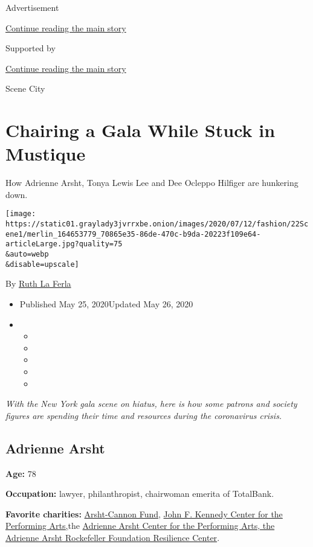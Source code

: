 Advertisement

\protect\hyperlink{after-top}{Continue reading the main story}

Supported by

\protect\hyperlink{after-sponsor}{Continue reading the main story}

Scene City

\hypertarget{chairing-a-gala-while-stuck-in-mustique}{%
\section{Chairing a Gala While Stuck in
Mustique}\label{chairing-a-gala-while-stuck-in-mustique}}

How Adrienne Arsht, Tonya Lewis Lee and Dee Ocleppo Hilfiger are
hunkering down.

\texttt{[image: https://static01.graylady3jvrrxbe.onion/images/2020/07/12/fashion/22Scene1/merlin\_164653779\_70865e35-86de-470c-b9da-20223f109e64-articleLarge.jpg?quality=75\\\&auto=webp\\\&disable=upscale]}

By \href{https://www.nytimes3xbfgragh.onion/by/ruth-la-ferla}{Ruth La
Ferla}

\begin{itemize}
\item
  Published May 25, 2020Updated May 26, 2020
\item
  \begin{itemize}
  \item
  \item
  \item
  \item
  \item
  \end{itemize}
\end{itemize}

\emph{With the New York gala scene on hiatus, here is how some patrons
and society figures are spending their time and resources during the
coronavirus crisis.}

\hypertarget{adrienne-arsht}{%
\subsection{Adrienne Arsht}\label{adrienne-arsht}}

\textbf{Age:} 78

\textbf{Occupation:} lawyer, philanthropist, chairwoman emerita of
TotalBank.

\textbf{Favorite charities:}
\href{https://arshtcannonfund.org}{Arsht-Cannon Fund},
\href{https://www.kennedy-center.org/account/login/}{John F. Kennedy
Center for the Performing Arts,}the
\href{https://www.onebillionresilient.org}{Adrienne Arsht Center for the
Performing Arts, the Adrienne Arsht Rockefeller Foundation Resilience
Center}.

